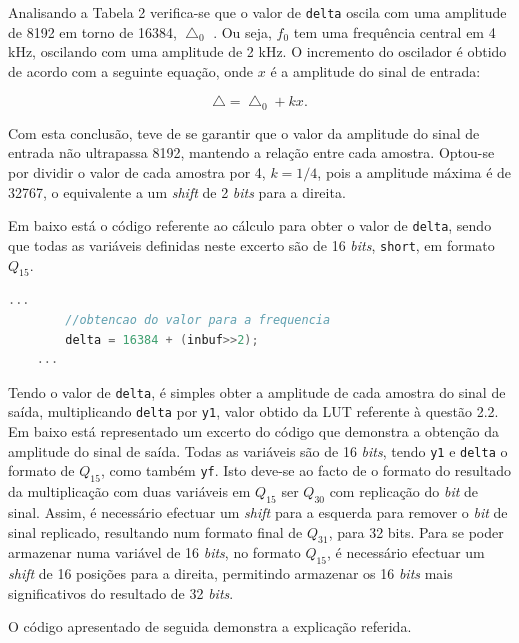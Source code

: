 \documentclass[11pt]{article}
\numberwithin{equation}{section}
\begin{document}
Analisando a Tabela 2 verifica-se que o valor de \texttt{delta} oscila com uma amplitude de 8192 em torno de 16384, $\bigtriangleup_{0}$ . Ou seja, $f_{0}$ tem uma frequência central em 4 kHz, oscilando com uma amplitude de 2 kHz. O incremento do oscilador é obtido de acordo com a seguinte equação, onde $x$ é a amplitude do sinal de entrada: 

\vspace{-3mm}
\begin{equation}
\bigtriangleup = \bigtriangleup_{0} + kx.
\end{equation}

Com esta conclusão, teve de se garantir que o valor da amplitude do sinal de entrada não ultrapassa 8192, mantendo a relação entre cada amostra. Optou-se por dividir o valor de cada amostra por 4, $k = 1/4$, pois a amplitude máxima é de 32767, o equivalente a um \textit{shift} de 2 \textit{bits} para a direita. 

Em baixo está o código referente ao cálculo para obter o valor de \texttt{delta}, sendo que todas as variáveis definidas neste excerto são de 16 \textit{bits}, \texttt{short}, em formato $Q_{15}$.

\begin{lstlisting}[language=C]
	...	
		//obtencao do valor para a frequencia		
		delta = 16384 + (inbuf>>2); 
	...
\end{lstlisting}

Tendo o valor de \texttt{delta}, é simples obter a amplitude de cada amostra do sinal de saída, multiplicando \texttt{delta} por \texttt{y1}, valor obtido da LUT referente à questão 2.2. Em baixo está representado um excerto do código que demonstra a obtenção da amplitude do sinal de saída. Todas as variáveis são de 16 \textit{bits}, tendo \texttt{y1} e \texttt{delta} o formato de $Q_{15}$, como também \texttt{yf}. Isto deve-se ao facto de o formato do resultado da multiplicação com duas variáveis em $Q_{15}$ ser $Q_{30}$ com replicação do \textit{bit} de sinal. Assim, é necessário efectuar um \textit{shift} para a esquerda para remover o \textit{bit} de sinal replicado, resultando num formato final de $Q_{31}$, para 32 bits. Para se poder armazenar numa variável de 16 \textit{bits}, no formato $Q_{15}$, é necessário efectuar um \textit{shift} de 16 posições para a direita, permitindo armazenar os 16 \textit{bits} mais significativos do resultado de 32 \textit{bits}.

O código apresentado de seguida demonstra a explicação referida.
\end{document}

